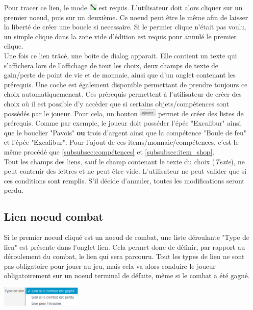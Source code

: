 \begin{description}
		Pour tracer ce lien, le mode \includegraphics[height=10pt]{img/modeLien.png} est requis. L'utilisateur doit alors cliquer sur un premier noeud, puis sur un deuxième. Ce noeud peut être le même afin de laisser la liberté de créer une boucle si necessaire.
		Si le permier clique n'était pas voulu, un simple clique dans la zone vide d'édition est requis pour annulé le premier clique.\\

		Une fois ce lien trâcé, une boite de dialog apparait. Elle contient un texte qui s'affichera lors de l'affichage de tout les choix, deux champs de texte de gain/perte de point de vie et de monnaie, ainsi que d'un onglet contenant les prérequis. Une coche est également disponible permettant de prendre toujours ce choix automatiquemenent.
		Ces prérequis permettent à l'utilisateur de créer des choix où il est possible d'y accèder que si certains objets/compétences sont possédés par le joueur.
		Pour cela, un bouton \includegraphics[height=10pt]{img/ajouterBouton.png} permet de créer des listes de prérequis. Comme par exemple, le joueur doit posséder l'épée "Excalibur" ainsi que le bouclier "Pavois" \textbf{ou} trois d'argent ainsi que la compétence "Boule de feu" et l'épée "Excalibur".
		Pour l'ajout de ces items/monnaie/compétences, c'est le même procédé que \ref{subsubsec:compétences} et \ref{subsubsec:item_shop}.\\

		Tout les champs des liens, sauf le champ contenant le texte du choix (\textit{Texte}), ne peut contenir des lettres et ne peut être vide. L'utilisateur ne peut valider que si ces conditions sont remplis. S'il décide d'annuler, toutes les modifications seront perdu.\\

	\subsection{Lien noeud combat}\label{subsection:lienCombat}
		\begin{minipage}{0.70\textwidth}
			Si le premier noeud cliqué est un noeud de combat, une liste déroulante "Type de lien" est présente dans l'onglet lien. Cela permet donc de définir, par rapport au déroulement du combat, le lien qui sera parcouru. Tout les types de lien ne sont pas obligatoire pour jouer au jeu, mais cela va alors conduire le joueur obligatoirement sur un noeud terminal de défaite, même si le combat a été gagné.
		\end{minipage}
		\hfill
		\begin{minipage}{4cm}
			\includegraphics[width=4cm]{img/lienCombat.png}
		\end{minipage}


\end{description}
